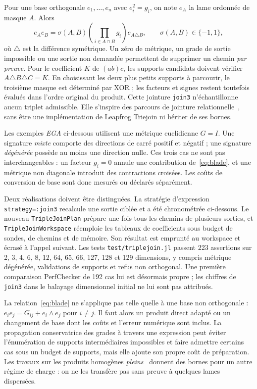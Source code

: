 \documentclass[11pt,a4paper]{article}
\newcommand{\code}[1]{\texttt{#1}}
\begin{document}
Pour une base orthogonale $e_1,\ldots,e_n$ avec $e_i^2=g_i$, on note $e_A$ la
lame ordonnée de masque $A$. Alors
\begin{equation}
e_Ae_B=\sigma(A,B)\left(\prod_{i\in A\cap B}g_i\right)e_{A\triangle B},
\qquad \sigma(A,B)\in\{-1,1\},
\label{eq:blade}
\end{equation}
où $\triangle$ est la différence symétrique. Un zéro de métrique, un grade de
sortie impossible ou une sortie non demandée permettent de supprimer un chemin
\emph{par preuve}. Pour le coefficient $K$ de $(ab)c$, les supports candidats
doivent vérifier $A\triangle B\triangle C=K$. En choisissant les deux plus
petits supports à parcourir, le troisième masque est déterminé par XOR ; les
facteurs et signes restent toutefois évalués dans l'ordre original du produit.
Cette jointure \code{join3} n'échantillonne aucun triplet admissible. Elle
s'inspire des parcours de jointure relationnelle~\cite{leapfrog}, sans être une
implémentation de Leapfrog Triejoin ni hériter de ses bornes.

Les exemples \emph{EGA} ci-dessous utilisent une métrique euclidienne
$G=I$. Une signature \emph{mixte} comporte des directions de carré
positif et négatif ; une signature \emph{dégénérée} possède au moins une
direction nulle. Ces trois cas ne sont pas interchangeables : un facteur
$g_i=0$ annule une contribution de~\eqref{eq:blade}, et une métrique
non diagonale introduit des contractions croisées. Les coûts de conversion
de base sont donc mesurés ou déclarés séparément.

Deux réalisations doivent être distinguées. La stratégie d'expression
\code{strategy=:join3} recalcule une sortie ciblée et a été chronométrée
ci-dessous. Le nouveau \code{TripleJoinPlan} prépare une fois tous les chemins
de plusieurs sorties, et \code{TripleJoinWorkspace} réemploie les tableaux de
coefficients sous budget de sondes, de chemins et de mémoire. Son résultat est
emprunté au workspace et écrasé à l'appel suivant. Les tests
\code{test/triplejoin.jl} passent 223 assertions sur 2, 3, 4, 6, 8, 12,
64, 65, 66, 127, 128 et 129 dimensions, y compris métrique dégénérée,
validations de supports et refus non orthogonal. Une première comparaison
PerfChecker de 192 cas lui est désormais propre ; les chiffres de
\code{join3} dans le balayage dimensionnel initial ne lui sont pas attribués.

La relation~\eqref{eq:blade} ne s'applique pas telle quelle à une base non
orthogonale : $e_i e_j=G_{ij}+e_i\wedge e_j$ pour $i\ne j$. Il faut alors un
produit direct adapté ou un changement de base dont les coûts et l'erreur
numérique sont inclus. La propagation conservatrice des grades à travers une
expression peut éviter l'énumération de supports intermédiaires impossibles et
faire admettre certains cas sous un budget de supports, mais elle ajoute son
propre coût de préparation. Les travaux sur les produits homogènes
\emph{pleins}~\cite{breuils2020} donnent des bornes pour un autre régime de
charge : on ne les transfère pas sans preuve à quelques lames dispersées.
\end{document}
